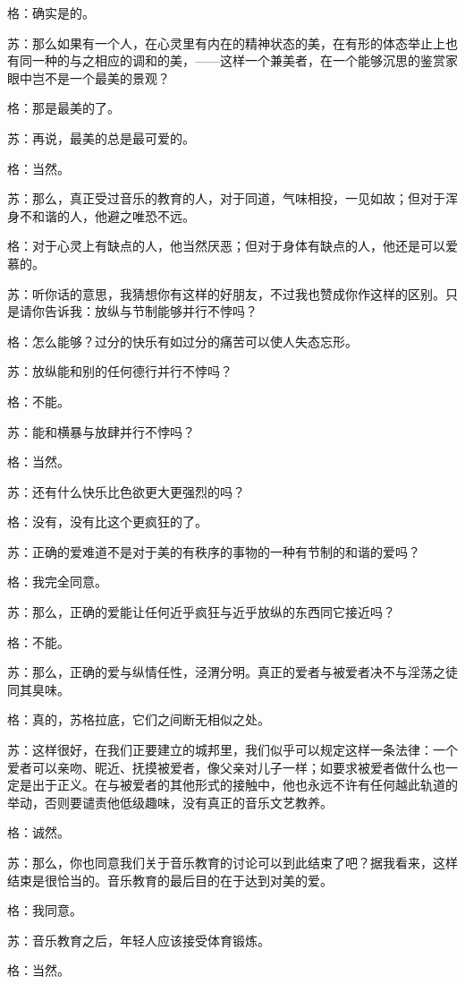 \documentclass[12pt,oneside]{book}
\begin{document}
格：确实是的。

苏：那么如果有一个人，在心灵里有内在的精神状态的美，在有形的体态举止上也有同一种的与之相应的调和的美，——这样一个兼美者，在一个能够沉思的鉴赏家眼中岂不是一个最美的景观？

格：那是最美的了。

苏：再说，最美的总是最可爱的。

格：当然。

苏：那么，真正受过音乐的教育的人，对于同道，气味相投，一见如故；但对于浑身不和谐的人，他避之唯恐不远。

格：对于心灵上有缺点的人，他当然厌恶；但对于身体有缺点的人，他还是可以爱慕的。

苏：听你话的意思，我猜想你有这样的好朋友，不过我也赞成你作这样的区别。只是请你告诉我：放纵与节制能够并行不悖吗？

格：怎么能够？过分的快乐有如过分的痛苦可以使人失态忘形。

苏：放纵能和别的任何德行并行不悖吗？

格：不能。

苏：能和横暴与放肆并行不悖吗？

格：当然。

苏：还有什么快乐比色欲更大更强烈的吗？

格：没有，没有比这个更疯狂的了。

苏：正确的爱难道不是对于美的有秩序的事物的一种有节制的和谐的爱吗？

格：我完全同意。

苏：那么，正确的爱能让任何近乎疯狂与近乎放纵的东西同它接近吗？

格：不能。

苏：那么，正确的爱与纵情任性，泾渭分明。真正的爱者与被爱者决不与淫荡之徒同其臭味。

格：真的，苏格拉底，它们之间断无相似之处。

苏：这样很好，在我们正要建立的城邦里，我们似乎可以规定这样一条法律：一个爱者可以亲吻、昵近、抚摸被爱者，像父亲对儿子一样；如要求被爱者做什么也一定是出于正义。在与被爱者的其他形式的接触中，他也永远不许有任何越此轨道的举动，否则要谴责他低级趣味，没有真正的音乐文艺教养。

格：诚然。

苏：那么，你也同意我们关于音乐教育的讨论可以到此结束了吧？据我看来，这样结束是很恰当的。音乐教育的最后目的在于达到对美的爱。

格：我同意。

苏：音乐教育之后，年轻人应该接受体育锻炼。

格：当然。
\end{document}
